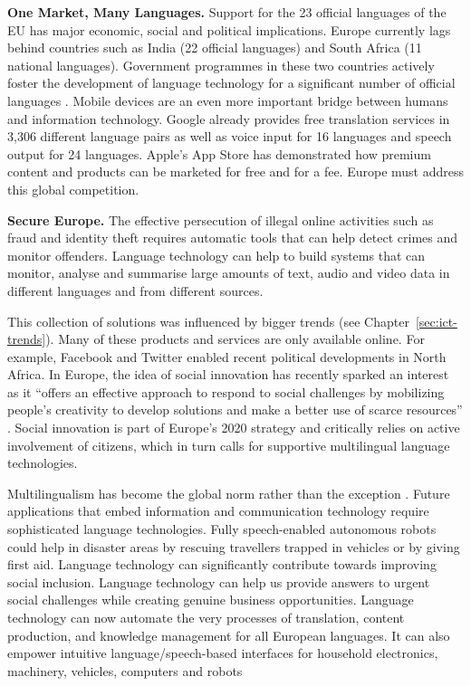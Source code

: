 \documentclass[10pt, plain]{../../metanetpaper}
\begin{document}
\begin{multicols}{2}
\textbf{One Market, Many Languages.} Support for the 23 official languages of the EU has major economic, social and political implications. Europe currently lags behind countries such as India (22 official languages) and South Africa (11 national languages). Government programmes in these two countries actively foster the development of language technology for a significant number of official languages \cite{india2012,sa2012}. Mobile devices are an even more important bridge between humans and information technology. Google already provides free translation services in 3,306 different language pairs as well as voice input for 16 languages and speech output for 24 languages. Apple's App Store has demonstrated how premium content and products can be marketed for free and for a fee. Europe must address this global competition.

\textbf{Secure Europe.} The effective persecution of illegal online activities such as fraud and identity theft requires automatic tools that can help detect crimes and monitor offenders. Language technology can help to build systems that can monitor, analyse and summarise large amounts of text, audio and video data in different languages and from different sources.

This collection of solutions was influenced by bigger trends (see Chapter~\ref{sec:ict-trends}). Many of these products and services are only available online. For example, Facebook and Twitter enabled recent political developments in North Africa. In Europe, the idea of social innovation has recently sparked an interest as it “offers an effective approach to respond to social challenges by mobilizing people's creativity to develop solutions and make a better use of scarce resources” \cite{EC5}. Social innovation is part of Europe’s 2020 strategy and critically relies on active involvement of citizens, which in turn calls for supportive multilingual language technologies.

Multilingualism has become the global norm rather than the exception \cite{maaya2012}. Future applications that embed information and communication technology require sophisticated language technologies. Fully speech-enabled autonomous robots could help in disaster areas by rescuing travellers trapped in vehicles or by giving first aid. Language technology can significantly contribute towards improving social inclusion. Language technology can help us provide answers to urgent social challenges while creating genuine business opportunities.  Language technology can now automate the very processes of translation, content production, and knowledge management for all European languages. It can also empower intuitive language/speech-based interfaces for household electronics, machinery, vehicles, computers and robots


\end{multicols}
\end{document}
